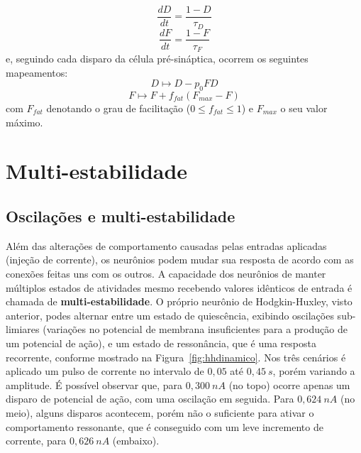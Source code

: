 \begin{equation}\label{eq:depressao_sinaptica}
	\frac{dD}{dt}=\frac{1-D}{\tau_D}
\end{equation}
\begin{equation}\label{eq:facilitacao_sinaptica}
	\frac{dF}{dt}=\frac{1-F}{\tau_F}
\end{equation}
e, seguindo cada disparo da célula pré-sináptica, ocorrem os seguintes mapeamentos:
\begin{equation}\label{eq:mapeamento_depressao_sinaptica}
	D\mapsto D-p_0FD
\end{equation}
\begin{equation}\label{eq:mapeamento_facilitacao_sinaptica}
	F\mapsto F+f_{fat}(F_{max}-F)
\end{equation}
com $F_{fat}$ denotando o grau de facilitação ($0\leq f_{fat}\leq 1$) e $F_{max}$ o seu valor máximo.

\section{Multi-estabilidade}\label{sec:biestabilidade}

\subsection{Oscilações e multi-estabilidade}
Além das alterações de comportamento causadas pelas entradas aplicadas (injeção de corrente), os neurônios podem mudar sua resposta de acordo com as conexões feitas uns com os outros. A capacidade dos neurônios de manter múltiplos estados de atividades mesmo recebendo valores idênticos de entrada é chamada de \textbf{multi-estabilidade}. O próprio neurônio de Hodgkin-Huxley, visto anterior, podes alternar entre um estado de quiescência, exibindo oscilações sub-limiares (variações no potencial de membrana insuficientes para a produção de um potencial de ação), e um estado de ressonância, que é uma resposta recorrente, conforme mostrado na Figura~\ref{fig:hhdinamico}. Nos três cenários é aplicado um pulso de corrente no intervalo de $0,05$ até $0,45\ s$, porém variando a amplitude. É possível observar que, para $0,300\ nA$ (no topo) ocorre apenas um disparo de potencial de ação, com uma oscilação em seguida. Para $0,624\ nA$ (no meio), alguns disparos acontecem, porém não o suficiente para ativar o comportamento ressonante, que é conseguido com um leve incremento de corrente, para $0,626\ nA$ (embaixo).

